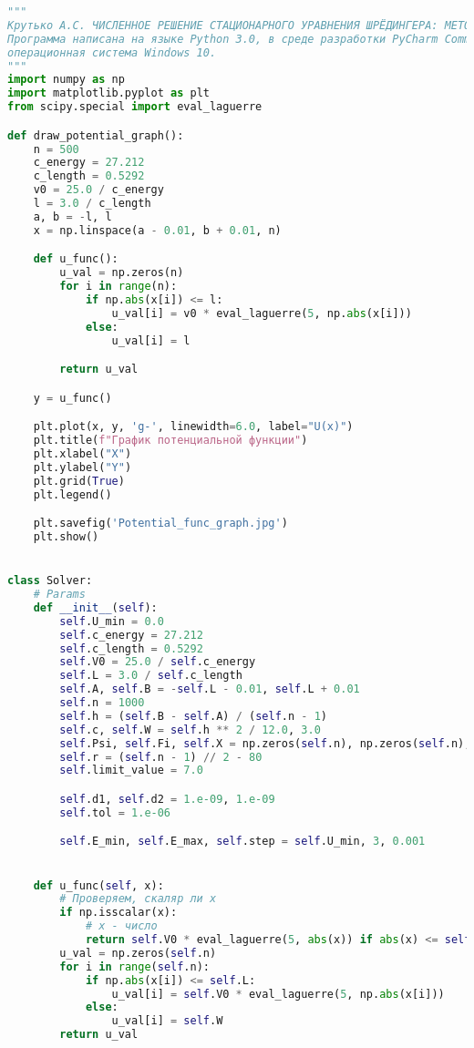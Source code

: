 \begin{lstlisting}[language=Python, caption=Код файла solver.py,label={lst:solver}]
"""
Крутько А.С. ЧИСЛЕННОЕ РЕШЕНИЕ СТАЦИОНАРНОГО УРАВНЕНИЯ ШРЁДИНГЕРА: МЕТОД ПРИСТРЕЛКИ
Программа написана на языке Python 3.0, в среде разработки PyCharm Community Edition 2024.2.1,
операционная система Windows 10.
"""
import numpy as np
import matplotlib.pyplot as plt
from scipy.special import eval_laguerre

def draw_potential_graph():
    n = 500
    c_energy = 27.212
    c_length = 0.5292
    v0 = 25.0 / c_energy
    l = 3.0 / c_length
    a, b = -l, l
    x = np.linspace(a - 0.01, b + 0.01, n)

    def u_func():
        u_val = np.zeros(n)
        for i in range(n):
            if np.abs(x[i]) <= l:
                u_val[i] = v0 * eval_laguerre(5, np.abs(x[i]))
            else:
                u_val[i] = l

        return u_val

    y = u_func()

    plt.plot(x, y, 'g-', linewidth=6.0, label="U(x)")
    plt.title(f"График потенциальной функции")
    plt.xlabel("X")
    plt.ylabel("Y")
    plt.grid(True)
    plt.legend()

    plt.savefig('Potential_func_graph.jpg')
    plt.show()


class Solver:
    # Params
    def __init__(self):
        self.U_min = 0.0
        self.c_energy = 27.212
        self.c_length = 0.5292
        self.V0 = 25.0 / self.c_energy
        self.L = 3.0 / self.c_length
        self.A, self.B = -self.L - 0.01, self.L + 0.01
        self.n = 1000
        self.h = (self.B - self.A) / (self.n - 1)
        self.c, self.W = self.h ** 2 / 12.0, 3.0
        self.Psi, self.Fi, self.X = np.zeros(self.n), np.zeros(self.n), np.linspace(self.A, self.B, self.n)
        self.r = (self.n - 1) // 2 - 80
        self.limit_value = 7.0

        self.d1, self.d2 = 1.e-09, 1.e-09
        self.tol = 1.e-06

        self.E_min, self.E_max, self.step = self.U_min, 3, 0.001


    def u_func(self, x):
        # Проверяем, скаляр ли x
        if np.isscalar(x):
            # x - число
            return self.V0 * eval_laguerre(5, abs(x)) if abs(x) <= self.L else self.W
        u_val = np.zeros(self.n)
        for i in range(self.n):
            if np.abs(x[i]) <= self.L:
                u_val[i] = self.V0 * eval_laguerre(5, np.abs(x[i]))
            else:
                u_val[i] = self.W
        return u_val


\end{lstlisting}
